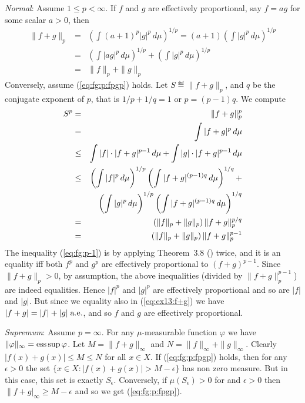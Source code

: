 \begin{enumerate}
\begin{itemize}
    \medskip
    \emph{Normal}: Assume  \(1\leq p<\infty\).
    If $f$ and $g$ are effectively proportional, say \(f=ag\)
    for some scalar \(a>0\), then
    \begin{eqnarray*}
    \|f + g\|_p
    &=& \left(\int (a+1)^p|g|^p\,d\mu\right)^{1/p}
              = (a+1)\left(\int |g|^p\,d\mu\right)^{1/p} \\
       &=&   \left(\int |ag|^p\,d\mu\right)^{1/p}
            + \left(\int |g|^p\,d\mu\right)^{1/p} \\
    &=& \|f\|_p + \|g\|_p
    \end{eqnarray*}
    Conversely, assume (\ref{eq:fg:p:fpgp}) holds.
    Let \(S \eqdef \|f + g\|_p\),
    and $q$ be the conjugate exponent of $p$, that is \(1/p+1/q = 1\)
    or \(p=(p-1)q\).
    We compute
    \begin{eqnarray}
    S^p
    &=& \notag
     \|f + g\|_p^p  \\
    &=& \notag
     \int |f+g|^p\,d\mu \\
    &\leq& \label{eq:ex13:f+g}
           \int |f|\cdot |f+g|^{p-1}\,d\mu
         + \int |g|\cdot |f+g|^{p-1}\,d\mu \\
    &\leq& \label{eq:fg:p-1}
         \left(\int |f|^p\,d\mu\right)^{1/p}
            \left(\int |f+g|^{(p-1)q}\,d\mu\right)^{1/q}
         + \\
    &&   \notag
          \left(\int |g|^p\,d\mu\right)^{1/p}
            \left(\int |f+g|^{(p-1)q}\,d\mu\right)^{1/q} \\
    &=&  \notag
         \left(\|f\|_p + \|g\|_p\right) \|f+g\|_p^{p/q} \\
    &=&  \notag
         \left(\|f\|_p + \|g\|_p\right) \|f+g\|_p^{p-1}
    \end{eqnarray}
    The inequality (\ref{eq:fg:p-1}) is by applying
    Theorem~3.8 (\cite{RudinRCA80}) twice, and it is an equality
    iff both \(f^p\) and \(g^p\) are effectively proportional
    to \((f+g)^{p-1}\). Since \(\|f+g\|_p > 0\), by assumption,
    the above inequalities (divided by \(\|f+g\|_p^{p-1}\))
    are indeed equalities.
    Hence \(|f|^p\) and \(|g|^p\) are effectively proportional
    and so are \(|f|\) and \(|g|\).
    But since we equality also in (\ref{eq:ex13:f+g})
    we have \(|f+g|=|f|+|g| \;\textrm{a.e.}\),
    and so $f$ and $g$ are effectively proportional.

    \medskip
    \emph{Supremum}: Assume \(p=\infty\).
    For any \(\mu\)-measurable function \(\varphi\)
    we have \(\|\varphi\|_\infty = \operatorname*{ess\,sup} \varphi\).
    Let \(M=\|f + g\|_\infty\) and
        \(N = \|f\|_\infty + \|g\|_\infty\).
    Clearly \(|f(x)+g(x)|\leq M \leq N\) for all \(x\in X\).
    If (\ref{eq:fg:p:fpgp}) holds, then for any \(\epsilon>0\)
    the set \(\{x\in X: |f(x)+g(x)| > M-\epsilon\}\) has non zero measure.
    But in this case, this set is exactly \(S_\epsilon\).
    Conversely, if \(\mu(S_\epsilon)>0\) for and \(\epsilon > 0\)
    then \(\|f+g|_\infty \geq M-\epsilon\) and so we get
    (\ref{eq:fg:p:fpgp}).



\end{itemize}
\end{enumerate}

